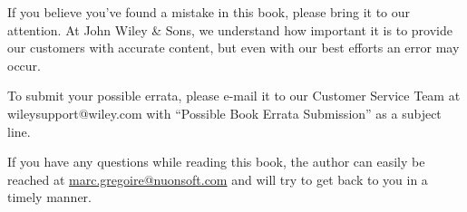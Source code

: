 
If you believe you’ve found a mistake in this book, please bring it to our attention. At John Wiley \& Sons, we understand how important it is to provide our customers with accurate content, but even with our best efforts an error may occur.

To submit your possible errata, please e-mail it to our Customer Service Team at wileysupport@wiley.com with “Possible Book Errata Submission” as a subject line.


If you have any questions while reading this book, the author can easily be reached at \url{marc.gregoire@nuonsoft.com} and will try to get back to you in a timely manner.